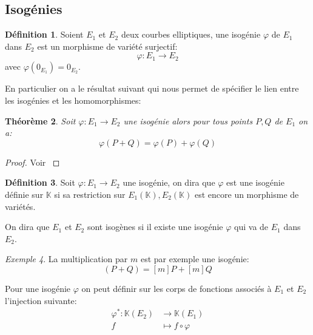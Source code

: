 \documentclass[10pt,a4paper]{book}
\theoremstyle{plain}
\newtheorem{thm}{Théorème}[chapter]
\theoremstyle{definition}
\theoremstyle{definition}
\theoremstyle{definition}
\theoremstyle{definition}
\newtheorem{defi}[thm]{Définition}
\theoremstyle{remark}
\theoremstyle{remark}
\newtheorem{exe}[thm]{Exemple}
\theoremstyle{definition}
\begin{document}
\subsection{Isogénies}

\begin{defi}
Soient $E_1$ et $E_2$ deux courbes elliptiques, une isogénie $\varphi$ de $E_1$ dans $E_2$ est un morphisme de variété surjectif:
\begin{equation*}
\varphi:E_1 \rightarrow E_2
\end{equation*}
avec $\varphi(0_{E_1})=0_{E_2}$.
\end{defi}
En particulier on a le résultat suivant qui nous permet de spécifier le lien 
entre les isogénies et les homomorphismes:

\begin{thm}
Soit $\varphi:E_1 \rightarrow E_2$ une isogénie alors pour tous points $P,Q$ de $E_1$ on a:
\begin{equation*}
\varphi(P+Q)=\varphi(P)+\varphi(Q)
\end{equation*}
\end{thm}

\begin{proof}
Voir \cite[Theoreme III.4.8]{Silv1}
\end{proof}

\begin{defi}
Soit $\varphi: E_1 \rightarrow E_2$ une isogénie, on dira que $\varphi$ est une
isogénie définie sur $\mathbb{K}$ si sa restriction sur $E_1(\mathbb{K}),
E_2(\mathbb{K})$ est encore un morphisme de variétés.
\end{defi}

On dira que $E_1$ et $E_2$ sont isogènes si il existe une isogénie $\varphi$ qui va de $E_1$ dans $E_2$. 

\begin{exe}
La multiplication par $m$ est par exemple une isogénie:
\begin{equation*}
[m](P+Q)=[m]P+[m]Q
\end{equation*}
\end{exe}

Pour une isogénie $\varphi$ on peut définir sur les corps de fonctions associés à $E_1$ et $E_2$ l'injection suivante:
\begin{equation*}
\begin{alignedat}{1}
\varphi^*: \mathbb{K}(E_2) & \rightarrow \mathbb{K}(E_1) \\
f & \mapsto f  \circ \varphi
\end{alignedat}
\end{equation*}
\end{document}

